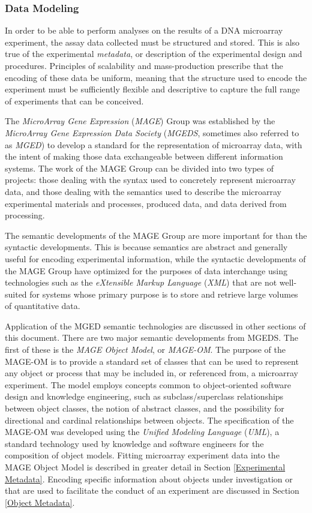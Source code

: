 \subsubsection{Data Modeling}
\label{Data Modeling}

In order to be able to perform analyses on the results of a DNA microarray
experiment, the assay data collected must be structured and stored.  This is
also true of the experimental \emph{metadata}, or description of the
experimental design and procedures.  Principles of scalability and
mass-production prescribe that the encoding of these data be uniform, meaning
that the structure used to encode the experiment must be sufficiently flexible
and descriptive to capture the full range of experiments that can be conceived.

The \emph{MicroArray Gene Expression} (\emph{MAGE}) Group was established by
the \emph{MicroArray Gene Expression Data Society} (\emph{MGEDS}, sometimes
also referred to as \emph{MGED}) to develop a standard for the representation
of microarray data, with the intent of making those data exchangeable between
different information systems.  The work of the MAGE Group can be divided into
two types of projects: those dealing with the syntax used to concretely
represent microarray data, and those dealing with the semantics used to
describe the microarray experimental materials and processes, produced data,
and data derived from processing.

The semantic developments of the MAGE Group are more important for \dbthesis
than the syntactic developments.  This is because semantics are abstract and
generally useful for encoding experimental information, while the syntactic
developments of the MAGE Group have optimized for the purposes of data
interchange using technologies such as the \emph{eXtensible Markup Language}
(\emph{XML}) that are not well-suited for systems whose primary purpose is to
store and retrieve large volumes of quantitative data.

Application of the MGED semantic technologies are discussed in other sections
of this document.  There are two major semantic developments from MGEDS.  The
first of these is the \emph{MAGE Object Model}, or \emph{MAGE-OM}.  The purpose
of the MAGE-OM is to provide a standard set of classes that can be used to
represent any object or process that may be included in, or referenced from, a
microarray experiment.  The model employs concepts common to object-oriented
software design and knowledge engineering, such as subclass/superclass
relationships between object classes, the notion of abstract classes, and the
possibility for directional and cardinal relationships between objects.  The
specification of the MAGE-OM was developed using the \emph{Unified Modeling
Language} (\emph{UML}), a standard technology used by knowledge and software
engineers for the composition of object models.  Fitting microarray experiment
data into the MAGE Object Model is described in greater detail in Section
\ref{Experimental Metadata}.  Encoding specific information about objects under
investigation or that are used to facilitate the conduct of an experiment are
discussed in Section \ref{Object Metadata}.

